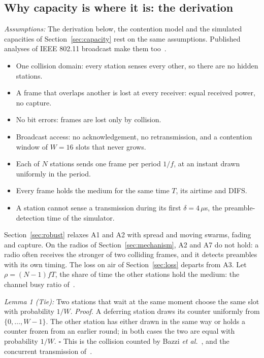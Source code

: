 \documentclass[lineno,pdflatex,sn-mathphys-num]{sn-jnl}
\newcommand{\us}{\,\ensuremath{\mu}s}
\newcommand{\runin}[1]{\textit{#1:}}
\renewcommand{\_}{\authbcunderscore\allowbreak}
\begin{document}
\begin{appendices}
\section{Why capacity is where it is: the derivation}\label{app:mechanism}
\runin{Assumptions} The derivation below, the contention model and the simulated capacities of
Section~\ref{sec:capacity} rest on the same assumptions. Published analyses of IEEE 802.11
broadcast make them too~\cite{bazzi2016beaconing,sepulcre2022analytical}.
\begin{itemize}
\item[A1] One collision domain: every station senses every other, so there are no hidden stations.
\item[A2] A frame that overlaps another is lost at every receiver: equal received power, no
capture.
\item[A3] No bit errors: frames are lost only by collision.
\item[A4] Broadcast access: no acknowledgement, no retransmission, and a contention window of
$W = 16$ slots that never grows.
\item[A5] Each of $N$ stations sends one frame per period $1/f$, at an instant drawn uniformly in
the period.
\item[A6] Every frame holds the medium for the same time $T$, its airtime and DIFS.
\item[A7] A station cannot sense a transmission during its first $\delta = 4$\us, the
preamble-detection time of the simulator.
\end{itemize}
Section~\ref{sec:robust} relaxes A1 and A2 with spread and moving swarms, fading and capture.
On the radios of Section~\ref{sec:mechanism}, A2 and A7 do not hold: a radio often receives the
stronger of two colliding frames, and it detects preambles with its own timing. The loss on
air of Section~\ref{sec:loss} departs from A3. Let $\rho = (N-1) f T$, the share of time the
other stations hold the medium: the channel busy ratio of~\cite{sepulcre2022analytical}.

\runin{Lemma 1 (Tie)} Two stations that wait at the same moment choose the same slot with
probability $1/W$. \emph{Proof.} A deferring station draws its counter uniformly from
$\{0,\dots,W-1\}$. The other station has either drawn in the same way or holds a counter frozen
from an earlier round; in both cases the two are equal with probability $1/W$. $\square$ This is
the collision counted by Bazzi \emph{et al.}~\cite{bazzi2016beaconing}, and the concurrent
transmission of~\cite{sepulcre2022analytical}.


\end{appendices}
\end{document}
